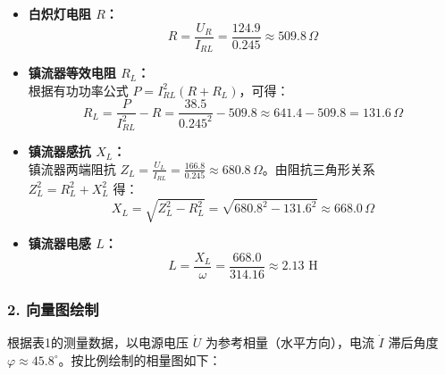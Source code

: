 ﻿\documentclass[10.5pt]{config}
\begin{document}
\begin{itemize}[leftmargin=2em]
    \item \textbf{白炽灯电阻 $R$：}
    \begin{equation*}
        R = \frac{U_R}{I_{RL}} = \frac{124.9}{0.245} \approx 509.8 \, \Omega
    \end{equation*}

    \item \textbf{镇流器等效电阻 $R_L$：} \\
    根据有功功率公式 $P = I_{RL}^2(R + R_L)$，可得：
    \begin{equation*}
        R_L = \frac{P}{I_{RL}^2} - R = \frac{38.5}{0.245^2} - 509.8 \approx 641.4 - 509.8 = 131.6 \, \Omega
    \end{equation*}

    \item \textbf{镇流器感抗 $X_L$：} \\
    镇流器两端阻抗 $Z_L = \frac{U_L}{I_{RL}} = \frac{166.8}{0.245} \approx 680.8 \, \Omega$。由阻抗三角形关系 $Z_L^2 = R_L^2 + X_L^2$ 得：
    \begin{equation*}
        X_L = \sqrt{Z_L^2 - R_L^2} = \sqrt{680.8^2 - 131.6^2} \approx 668.0 \, \Omega
    \end{equation*}

    \item \textbf{镇流器电感 $L$：}
    \begin{equation*}
        L = \frac{X_L}{\omega} = \frac{668.0}{314.16} \approx 2.13\text{ H}
    \end{equation*}
\end{itemize}

\subsubsection*{2. 向量图绘制}

根据表1的测量数据，以电源电压 $\dot{U}$ 为参考相量（水平方向），电流 $\dot{I}$ 滞后角度 $\varphi \approx 45.8^\circ$。按比例绘制的相量图如下：
\end{document}
